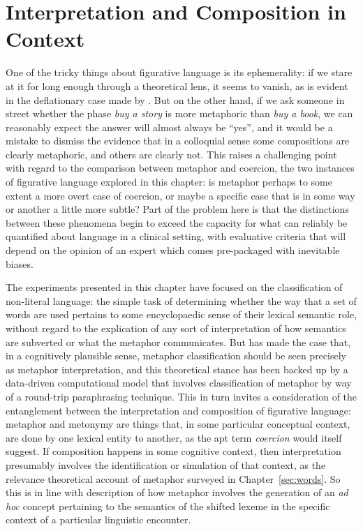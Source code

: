 \section{Interpretation and Composition in Context}
One of the tricky things about figurative language is its ephemerality: if we stare at it for long enough through a theoretical lens, it seems to vanish, as is evident in the deflationary case made by \cite{WilsonEA}.  But on the other hand, if we ask someone in street whether the phase \emph{buy a story} is more metaphoric than \emph{buy a book}, we can reasonably expect the answer will almost always be ``yes'', and it would be a mistake to dismiss the evidence that in a colloquial sense some compositions are clearly metaphoric, and others are clearly not.  This raises a challenging point with regard to the comparison between metaphor and coercion, the two instances of figurative language explored in this chapter: is metaphor perhaps to some extent a more overt case of coercion, or maybe a specific case that is in some way or another a little more subtle?  Part of the problem here is that the distinctions between these phenomena begin to exceed the capacity for what can reliably be quantified about language in a clinical setting, with evaluative criteria that will depend on the opinion of an expert which comes pre-packaged with inevitable biases.

The experiments presented in this chapter have focused on the classification of non-literal language: the simple task of determining whether the way that a set of words are used pertains to some encyclopaedic sense of their lexical semantic role, without regard to the explication of any sort of interpretation of how semantics are subverted or what the metaphor communicates.  But \cite{Shutova2010} has made the case that, in a cognitively plausible sense, metaphor classification should be seen precisely as metaphor interpretation, and this theoretical stance has been backed up by a data-driven computational model that involves classification of metaphor by way of a round-trip paraphrasing technique.  This in turn invites a consideration of the entanglement between the interpretation and composition of figurative language: metaphor and metonymy are things that, in some particular conceptual context, are done by one lexical entity to another, as the apt term \emph{coercion} would itself suggest.  If composition happens in some cognitive context, then interpretation presumably involves the identification or simulation of that context, as the relevance theoretical account of metaphor surveyed in Chapter~\ref{sec:words}.  So this is in line with  description of how metaphor involves the generation of an \emph{ad hoc} concept pertaining to the semantics of the shifted lexeme in the specific context of a particular linguistic encounter.

